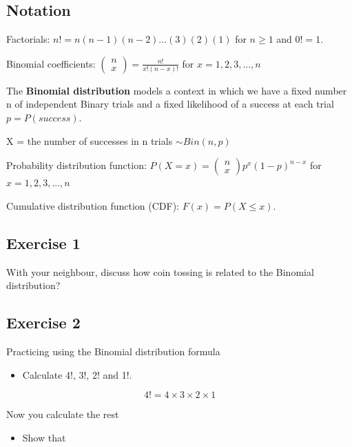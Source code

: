 \documentclass[
  10pt,
  letterpaper,
  DIV=11,
  numbers=noendperiod]{scrartcl}
\providecommand{\tightlist}{%
  \setlength{\itemsep}{0pt}\setlength{\parskip}{0pt}}\usepackage{longtable,booktabs,array}
\begin{document}
\hypertarget{notation}{%
\subsection{Notation}\label{notation}}

Factorials: \(n! = n(n - 1)(n - 2)...(3)(2)(1)\) for \(n \ge 1\) and
\(0! = 1\).

Binomial coefficients:
\(\left(\begin{matrix}n\\x\end{matrix}\right)=\frac{n!}{x!(n-x)!}\) for
\(x=1,2,3,...,n\)

The \textbf{Binomial distribution} models a context in which we have a
fixed number n of independent Binary trials and a fixed likelihood of a
success at each trial \(p = P(success)\).

X = the number of successes in n trials \(\sim Bin(n,p)\)

Probability distribution function:
\(P(X = x) = \left(\begin{matrix}n\\x\end{matrix}\right)p^x(1-p)^{n-x}\)
for \(x=1,2,3,...,n\)

Cumulative distribution function (CDF): \(F(x) = P(X \le x)\).

\hypertarget{exercise-1}{%
\subsection{Exercise 1}\label{exercise-1}}

With your neighbour, discuss how coin tossing is related to the Binomial
distribution?

\hypertarget{exercise-2}{%
\subsection{Exercise 2}\label{exercise-2}}

Practicing using the Binomial distribution formula

\begin{itemize}
\tightlist
\item
  Calculate 4!, 3!, 2! and 1!.
\end{itemize}

\[4!=4 \times 3 \times 2 \times 1\]

Now you calculate the rest

\begin{itemize}
\tightlist
\item
  Show that
\end{itemize}
\end{document}
